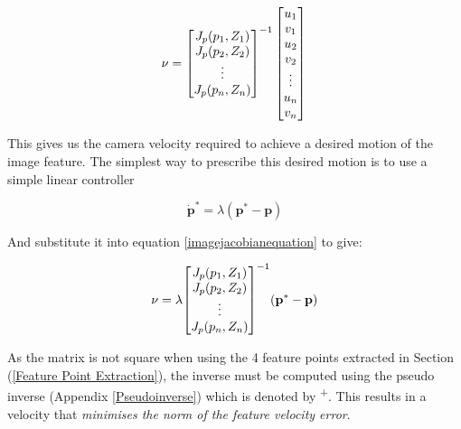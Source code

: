 \documentclass{UoNMCHA}
\numberwithin{equation}{section}
\begin{document}
\begin{equation}
	\label{imagejacobianequation}
	\mathbf{\nu} = \\
	{\begin{bmatrix} 
		J_{p}(p_{1} , Z_{1})   \\
		J_{p}(p_{2} , Z_{2})   \\
		\vdots \\
		J_{p}(p_{n} , Z_{n})
	\end{bmatrix}}^{-1} \\ 
	\begin{bmatrix} 
		u_{1} \\
		v_{1}  \\
		u_{2} \\
		v_{2}  \\
		\vdots\\
		u_{n} \\
		v_{n}  \\  
	\end{bmatrix} \\	
\end{equation} 

This gives us the camera velocity required to achieve a desired motion of the image feature. The simplest way to prescribe this desired motion is to use a simple linear controller 

\begin{equation}
	\mathbf{\dot{p}^{*}} = \lambda(\mathbf{p^{*}} - \mathbf{p})
\end{equation}

And substitute it into equation \ref{imagejacobianequation} to give:

\begin{equation}
	\label{velocityimagejacobian}
	\mathbf{\nu} = \\
	\lambda{\begin{bmatrix} 
		J_{p}(p_{1} , Z_{1})   \\
		J_{p}(p_{2} , Z_{2})   \\
		\vdots \\
		J_{p}(p_{n} , Z_{n})
	\end{bmatrix}}^{-1} \\ (\mathbf{p^{*}} - \mathbf{p})		
\end{equation} 

As the matrix is not square when using the 4 feature points extracted in Section (\ref{Feature Point Extraction}), the inverse must be computed using the pseudo inverse (Appendix \ref{Pseudoinverse}) which is denoted by \textsuperscript{+}. This results in a velocity that \textit{minimises the norm of the feature velocity error}.
\end{document}

